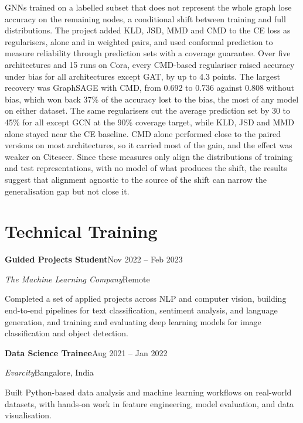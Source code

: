 \documentclass[a4paper,10pt]{article}
\newcommand{\row}[2]{\noindent#1\hfill#2\par}
\begin{document}
GNNs trained on a labelled subset that does not represent the whole graph lose accuracy on the
remaining nodes, a conditional shift between training and full distributions. The project added KLD,
JSD, MMD and CMD to the CE loss as regularisers, alone and in weighted pairs, and used conformal
prediction to measure reliability through prediction sets with a coverage guarantee. Over five
architectures and 15 runs on Cora, every CMD-based regulariser raised accuracy under bias for all
architectures except GAT, by up to 4.3 points. The largest recovery was GraphSAGE with CMD, from 0.692
to 0.736 against 0.808 without bias, which won back 37\% of the accuracy lost to the bias, the
most of any model on either dataset. The same regularisers cut the average prediction set by 30 to 45\%
for all except GCN at the 90\% coverage target, while KLD, JSD and MMD alone stayed near
the CE baseline. CMD alone performed close to the paired versions on most architectures, so it carried
most of the gain, and the effect was weaker on Citeseer. Since these measures only align the distributions of training and test
representations, with no model of what produces the shift, the results suggest that alignment agnostic
to the source of the shift can narrow the generalisation gap but not close it.

\section{Technical Training}

\row{\textbf{Guided Projects Student}}{Nov 2022 -- Feb 2023}
\row{\textit{The Machine Learning Company}}{Remote}
\vspace{1.5pt}

Completed a set of applied projects across NLP and computer vision, building end-to-end pipelines for
text classification, sentiment analysis, and language generation, and training and evaluating deep
learning models for image classification and object detection.
\vspace{5pt}

\row{\textbf{Data Science Trainee}}{Aug 2021 -- Jan 2022}
\row{\textit{Evarcity}}{Bangalore, India}
\vspace{1.5pt}

Built Python-based data analysis and machine learning workflows on real-world datasets, with hands-on
work in feature engineering, model evaluation, and data visualisation.
\end{document}
